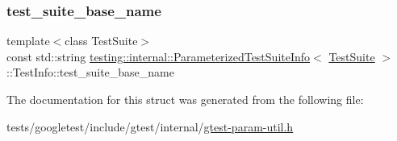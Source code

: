 \subsubsection{\texorpdfstring{test\+\_\+suite\+\_\+base\+\_\+name}{test\_suite\_base\_name}}
{\footnotesize\ttfamily template$<$class Test\+Suite$>$ \\
const std\+::string \hyperlink{classtesting_1_1internal_1_1ParameterizedTestSuiteInfo}{testing\+::internal\+::\+Parameterized\+Test\+Suite\+Info}$<$ \hyperlink{classtesting_1_1TestSuite}{Test\+Suite} $>$\+::Test\+Info\+::test\+\_\+suite\+\_\+base\+\_\+name}



The documentation for this struct was generated from the following file\+:\begin{DoxyCompactItemize}
\item 
tests/googletest/include/gtest/internal/\hyperlink{gtest-param-util_8h}{gtest-\/param-\/util.\+h}\end{DoxyCompactItemize}

